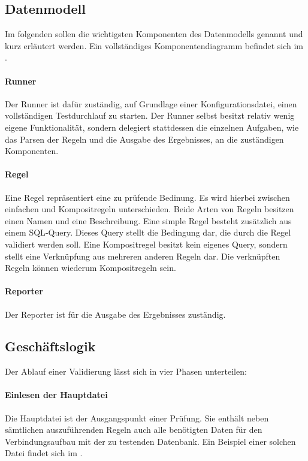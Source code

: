 \subsection{Datenmodell}
\label{sec:Datenmodell}

Im folgenden sollen die wichtigsten Komponenten des Datenmodells genannt und kurz erläutert werden. Ein vollständiges Komponentendiagramm befindet sich im .

\paragraph{Runner}
Der Runner ist dafür zuständig, auf Grundlage einer Konfigurationsdatei, einen vollständigen Testdurchlauf zu starten. Der Runner selbst besitzt relativ wenig eigene Funktionalität, sondern delegiert stattdessen die einzelnen Aufgaben, wie \zB das Parsen der Regeln und die Ausgabe des Ergebnisses, an die zuständigen Komponenten.

\paragraph{Regel}
Eine Regel repräsentiert eine zu prüfende Bedinung. Es wird hierbei zwischen einfachen und Kompositregeln unterschieden. Beide Arten von Regeln besitzen einen Namen und eine Beschreibung. Eine simple Regel besteht zusätzlich aus einem \acs{SQL}-Query. Dieses Query stellt die Bedingung dar, die durch die Regel validiert werden soll. Eine Kompositregel besitzt kein eigenes Query, sondern stellt eine Verknüpfung aus mehreren anderen Regeln dar. Die verknüpften Regeln können wiederum Kompositregeln sein.

\paragraph{Reporter}
Der Reporter ist für die Ausgabe des Ergebnisses zuständig.


\subsection{Geschäftslogik}
\label{sec:Geschaeftslogik}

Der Ablauf einer Validierung lässt sich in vier Phasen unterteilen:

\paragraph{Einlesen der Hauptdatei}
Die Hauptdatei ist der Ausgangspunkt einer Prüfung. Sie enthält neben sämtlichen auszuführenden Regeln auch alle benötigten Daten für den Verbindungsaufbau mit der zu testenden Datenbank. Ein Beispiel einer solchen Datei findet sich im .


